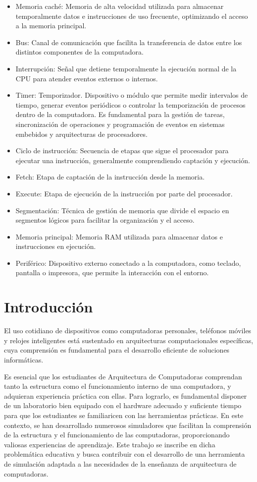 \documentclass[12pt,oneside]{templates/unerthesis}
\begin{document}
\begin{itemize}
\item
  Memoria caché: Memoria de alta velocidad utilizada para almacenar temporalmente datos e instrucciones de uso frecuente, optimizando el acceso a la memoria principal.
\item
  Bus: Canal de comunicación que facilita la transferencia de datos entre los distintos componentes de la computadora.
\item
  Interrupción: Señal que detiene temporalmente la ejecución normal de la CPU para atender eventos externos o internos.
\item
  Timer: Temporizador. Dispositivo o módulo que permite medir intervalos de tiempo, generar eventos periódicos o controlar la temporización de procesos dentro de la computadora. Es fundamental para la gestión de tareas, sincronización de operaciones y programación de eventos en sistemas embebidos y arquitecturas de procesadores.
\item
  Ciclo de instrucción: Secuencia de etapas que sigue el procesador para ejecutar una instrucción, generalmente comprendiendo captación y ejecución.
\item
  Fetch: Etapa de captación de la instrucción desde la memoria.
\item
  Execute: Etapa de ejecución de la instrucción por parte del procesador.
\item
  Segmentación: Técnica de gestión de memoria que divide el espacio en segmentos lógicos para facilitar la organización y el acceso.
\item
  Memoria principal: Memoria RAM utilizada para almacenar datos e instrucciones en ejecución.
\item
  Periférico: Dispositivo externo conectado a la computadora, como teclado, pantalla o impresora, que permite la interacción con el entorno.
\end{itemize}

\hypertarget{intro}{%
\chapter{Introducción}\label{intro}}

El uso cotidiano de dispositivos como computadoras personales, teléfonos móviles y relojes inteligentes está sustentado en arquitecturas computacionales específicas, cuya comprensión es fundamental para el desarrollo eficiente de soluciones informáticas.

Es esencial que los estudiantes de Arquitectura de Computadoras comprendan tanto la estructura como el funcionamiento interno de una computadora, y adquieran experiencia práctica con ellas. Para lograrlo, es fundamental disponer de un laboratorio bien equipado con el hardware adecuado y suficiente tiempo para que los estudiantes se familiaricen con las herramientas prácticas. En este contexto, se han desarrollado numerosos simuladores que facilitan la comprensión de la estructura y el funcionamiento de las computadoras, proporcionando valiosas experiencias de aprendizaje. Este trabajo se inscribe en dicha problemática educativa y busca contribuir con el desarrollo de una herramienta de simulación adaptada a las necesidades de la enseñanza de arquitectura de computadoras.
\end{document}
